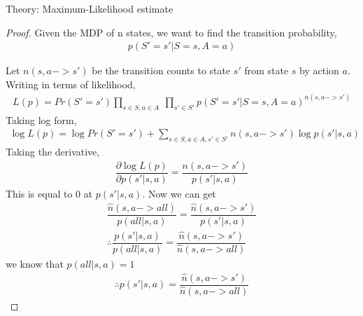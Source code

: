\documentclass[12pt]{article}
\newenvironment{problem}[2][\large Problem]{\begin{trivlist}
\item[\hskip \labelsep {\bfseries #1}\hskip \labelsep {\bfseries #2.}]}{\end{trivlist}}
\begin{document}
\newpage	
\begin{problem} {5} Theory: Maximum-Likelihood estimate\\
\begin{proof}	
Given the MDP of n states, we want to find the transition probability,
\begin{align}
	p(S'=s'|S=s,A=a)	
	\nonumber
\end{align}	  
 
Let $n(s,a ->s')$ be the transition counts to state $s'$ from state $s$ by action $a$. Writing in terms of likelihood,
\begin{align}
L(p)=Pr(S'=s')\prod_{s\in S,a \in A}~\prod_{s'\in S'}	p(S'=s'|S=s,A=a)^{n(s,a ->s')}
\nonumber
\end{align}	 
Taking log form, 
\begin{align}
\log L(p)= \log Pr(S'=s') + \sum_{s\in S,a \in A, s'\in S'}	{n(s,a ->s')} \log p(s'|s,a) 
\nonumber
\end{align}
Taking the derivative,
\begin{align}
\dfrac{\partial \log L(p)}{\partial p(s'|s,a)}= \dfrac{n(s,a ->s')}{p(s'|s,a)} 
\nonumber
\end{align}
This is equal to 0 at $p(s'|s,a)$. Now we can get
\begin{align}
\dfrac{\hat n(s,a ->all)}{p(all|s,a)}= \dfrac{\hat n(s,a ->s')}{p(s'|s,a)} 
\nonumber\\
\therefore \dfrac{p(s'|s,a)}{p(all|s,a)}= \dfrac{\hat n(s,a ->s')}{\hat n(s,a ->all)} 
\nonumber
\end{align}
we know that ${p(all|s,a)} = 1$
\begin{align}
\therefore {p(s'|s,a)}= \dfrac{\hat n(s,a ->s')}{\hat n(s,a ->all)} 
\nonumber
\end{align}
 
\end{proof}	

\end{problem}
\end{document}
